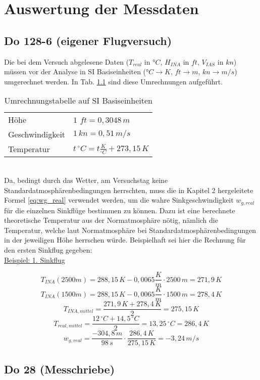 \chapter{Auswertung der Messdaten}
\label{chapter:auswertung}

\section{Do 128-6 (eigener Flugversuch)}
Die bei dem Versuch abgelesene Daten ($T_{real}$ in °$C$, $H_{INA}$ in $ft$, $V_{IAS}$ in $kn$) müssen vor der Analyse in SI Basiseinheiten (°$C  \rightarrow K$, $ft \rightarrow m$, $kn \rightarrow m/s$) umgerechnet werden. In Tab. \ref{tab:umrechnung_einheiten} sind diese Umrechnungen aufgeführt.
\begin{table}[h]
	\centering
	\begin{tabular}{l l}
		\hline
		Höhe & $1$ $ft=0,3048\,m$ \\
		Geschwindigkeit&   $1\,kn=0,51\,m/s$\\
		Temperatur &  $t\,^\circ C=t\frac{K}{^\circ C}+273,15\,K$\\
		\hline		
	\end{tabular}
	\caption{Umrechnungstabelle auf SI Basiseinheiten} \label{tab:umrechnung_einheiten}
\end{table} \\
Da, bedingt durch das Wetter, am Versuchstag keine Standardatmosphärenbedingungen herrschten, muss die in Kapitel 2 hergeleitete Formel \ref{eq:wg_real} verwendet werden, um die wahre Sinkgeschwindigkeit $w_{g,real}$ für die einzelnen Sinkflüge bestimmen zu können. Dazu ist eine berechnete theoretische Temperatur aus der Normatmosphäre nötig, nämlich die Temperatur, welche laut Normatmosphäre bei Standardatmosphärenbedingungen in der jeweiligen Höhe herrschen würde. Beispielhaft sei hier die Rechnung für den ersten Sinkflug gegeben:\\

\underline{Beispiel: 1. Sinkflug}

\begin{equation}
T_{INA}(2500m) = 288,15\,K - 0,0065 \frac{K}{m} \cdot 2500\,m = 271,9\,K
\end{equation}
\begin{equation}
T_{INA}(1500m) = 288,15\,K - 0,0065 \frac{K}{m} \cdot 1500\,m = 278,4\,K
\end{equation}
\begin{equation}
T_{INA,mittel} = \frac{271,9\,K + 278,4\,K}{2} = 275,15\,K
\end{equation}
\begin{equation}
T_{real,mittel} = \frac{12\,^\circ C + 14,5\,^\circ C}{2} = 13,25\,^\circ C =	286,4\,K
\end{equation}
\begin{equation}
w_{g,real} = \frac{-304,8\,m}{98\,s} \cdot \frac{286,4\,K}{275,15\,K} = - 3,24\,m/s
\end{equation}


\section{Do 28 (Messchriebe)}

\newpage